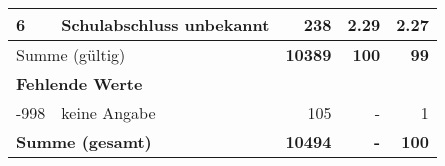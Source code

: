 \begin{longtable}{lXrrr}
     6 &
     \multicolumn{1}{X}{ Schulabschluss unbekannt   } &


       \num{238} &
       \num[round-mode=places,round-precision=2]{2,29} &
         \num[round-mode=places,round-precision=2]{2,27} \\
     \midrule
     \multicolumn{2}{l}{Summe (gültig)} &
       \textbf{\num{10389}} &
     \textbf{100} &
       \textbf{\num[round-mode=places,round-precision=2]{99}} \\
     \multicolumn{5}{l}{\textbf{Fehlende Werte}}\\
       -998 &
       keine Angabe &
         \num{105} &
        - &
         \num[round-mode=places,round-precision=2]{1} \\
     \midrule
     \multicolumn{2}{l}{\textbf{Summe (gesamt)}} &
          \textbf{\num{10494}} &
        \textbf{-} &
        \textbf{100} \\
     \bottomrule
     \end{longtable}
     
